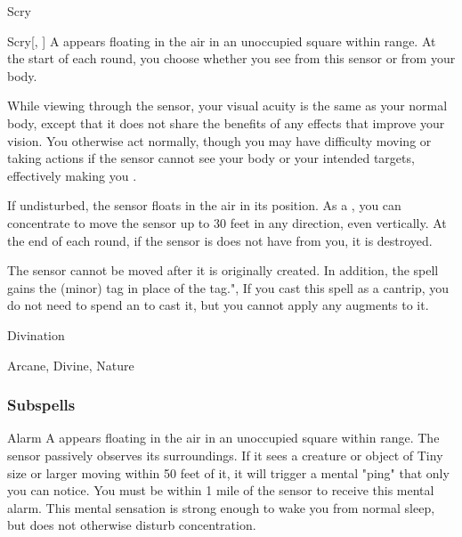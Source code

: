 \newpage
\begin{spellsection}{Scry}

\begin{spellheader}
\end{spellheader}


\begin{ability}{Scry}[, ]
A  appears floating in the air in an unoccupied square within \rngmed range.
At the start of each round, you choose whether you see from this sensor or from your body.

While viewing through the sensor, your visual acuity is the same as your normal body, except that it does not share the benefits of any  effects that improve your vision.
You otherwise act normally, though you may have difficulty moving or taking actions if the sensor cannot see your body or your intended targets, effectively making you \blinded.

If undisturbed, the sensor floats in the air in its position.
As a , you can concentrate to move the sensor up to 30 feet in any direction, even vertically.
At the end of each round, if the sensor is does not have  from you, it is destroyed.
\end{ability}



The sensor cannot be moved after it is originally created.
In addition, the spell gains the  (minor) tag in place of the  tag.",
If you cast this spell as a cantrip,
you do not need to spend an  to cast it,
but you cannot apply any augments to it.


 Divination

 Arcane, Divine, Nature
\end{spellsection}


\subsubsection{Subspells}


\begin{ability}[\nth{1}]{Alarm}
A  appears floating in the air in an unoccupied square within \rngmed range.
The sensor passively observes its surroundings.
If it sees a creature or object of Tiny size or larger moving within 50 feet of it, it will trigger a mental "ping" that only you can notice.
You must be within 1 mile of the sensor to receive this mental alarm.
This mental sensation is strong enough to wake you from normal sleep, but does not otherwise disturb concentration.
\end{ability}
\vspace{0.25em}


